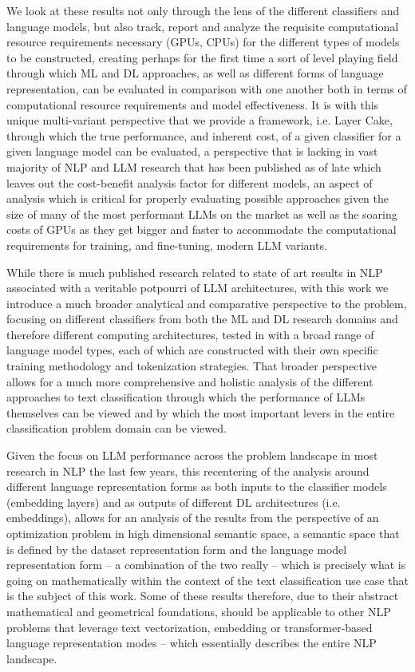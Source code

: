 \documentclass[final]{clv2025}
\begin{document}
We look at these results not only through the lens of the different classifiers and language models, but also track, report and analyze the requisite computational resource requirements necessary (GPUs, CPUs) for the different types of models to be constructed, creating perhaps for the first time a sort of level playing field through which ML and DL approaches, as well as different forms of language representation, can be evaluated in comparison with one another both in terms of computational resource requirements and model effectiveness. It is with this unique multi-variant perspective that we provide a framework, i.e. Layer Cake, through which the true performance, and inherent cost, of a given classifier for a given language model can be evaluated, a perspective that is lacking in vast majority of NLP and LLM research that has been published as of late which leaves out the cost-benefit analysis factor for different models, an aspect of analysis which is critical for properly evaluating possible approaches given the size of many of the most performant LLMs on the market as well as the soaring costs of GPUs as they get bigger and faster to accommodate the computational requirements for training, and fine-tuning, modern LLM variants.

While there is much published research related to state of art results in NLP associated with a veritable potpourri of LLM architectures, with this work we introduce a much broader analytical and comparative perspective to the problem, focusing on different classifiers from both the ML and DL research domains and therefore different computing architectures, tested in with a broad range of language model types, each of which are constructed with their own specific training methodology and tokenization strategies. That broader perspective allows for a much more comprehensive and holistic analysis of the different approaches to text classification through which the performance of LLMs themselves can be viewed and by which the most important levers in the entire classification problem domain can be viewed.

Given the focus on LLM performance across the problem landscape in most research in NLP the last few years, this recentering of the analysis around different language representation forms as both inputs to the classifier models (embedding layers) and as outputs of different DL architectures (i.e. embeddings), allows for an analysis of the results from the perspective of an optimization problem in high dimensional semantic space, a semantic space that is defined by the dataset representation form and the language model representation form – a combination of the two really – which is precisely what is going on mathematically within the context of the text classification use case that is the subject of this work. Some of these results therefore, due to their abstract mathematical and geometrical foundations, should be applicable to other NLP problems that leverage text vectorization, embedding or transformer-based language representation modes – which essentially describes the entire NLP landscape.
\end{document}
